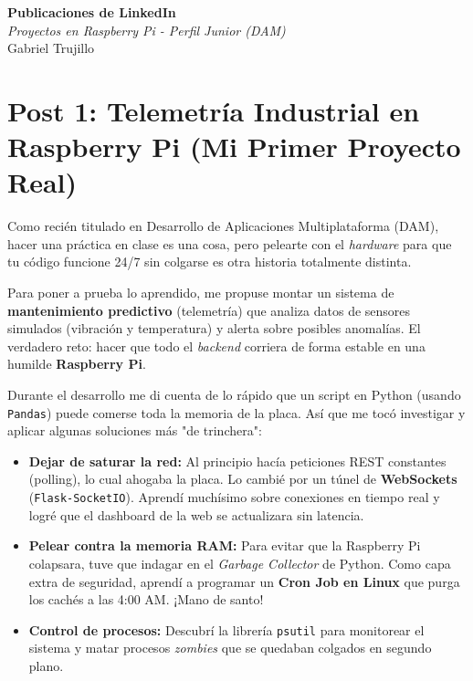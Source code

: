 \documentclass[11pt, a4paper]{article}
\begin{document}
\begin{center}
    {\Huge \textbf{Publicaciones de LinkedIn}} \\[0.5cm]
    {\large \textit{Proyectos en Raspberry Pi - Perfil Junior (DAM)}} \\[0.5cm]
    {\small Gabriel Trujillo}
\end{center}

\vspace{1cm}

\section*{Post 1: Telemetría Industrial en Raspberry Pi (Mi Primer Proyecto Real)}

Como recién titulado en Desarrollo de Aplicaciones Multiplataforma (DAM), hacer una práctica en clase es una cosa, pero pelearte con el \textit{hardware} para que tu código funcione 24/7 sin colgarse es otra historia totalmente distinta. 

Para poner a prueba lo aprendido, me propuse montar un sistema de \textbf{mantenimiento predictivo} (telemetría) que analiza datos de sensores simulados (vibración y temperatura) y alerta sobre posibles anomalías. El verdadero reto: hacer que todo el \textit{backend} corriera de forma estable en una humilde \textbf{Raspberry Pi}.

Durante el desarrollo me di cuenta de lo rápido que un script en Python (usando \texttt{Pandas}) puede comerse toda la memoria de la placa. Así que me tocó investigar y aplicar algunas soluciones más "de trinchera":

\begin{itemize}
    \item \textbf{Dejar de saturar la red:} Al principio hacía peticiones REST constantes (polling), lo cual ahogaba la placa. Lo cambié por un túnel de \textbf{WebSockets} (\texttt{Flask-SocketIO}). Aprendí muchísimo sobre conexiones en tiempo real y logré que el dashboard de la web se actualizara sin latencia.
    \item \textbf{Pelear contra la memoria RAM:} Para evitar que la Raspberry Pi colapsara, tuve que indagar en el \textit{Garbage Collector} de Python. Como capa extra de seguridad, aprendí a programar un \textbf{Cron Job en Linux} que purga los cachés a las 4:00 AM. ¡Mano de santo!
    \item \textbf{Control de procesos:} Descubrí la librería \texttt{psutil} para monitorear el sistema y matar procesos \textit{zombies} que se quedaban colgados en segundo plano.
\end{itemize}
\end{document}
